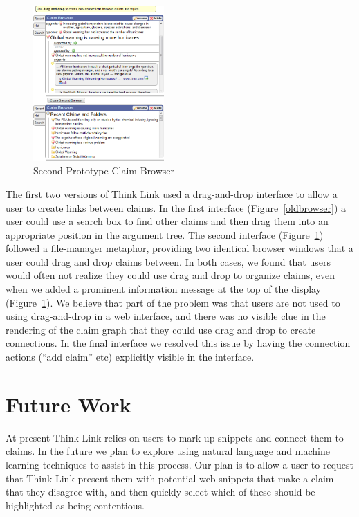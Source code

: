 \documentclass{chi2009}
\begin{document}
\begin{figure}[tb]
\begin{center}
	\includegraphics[width=5cm]{../screenshots/claimbrowse.png}
	\caption{Second Prototype Claim Browser}
	\label{secondbrowser}
\end{center}
\end{figure}

The first two versions of Think Link used a drag-and-drop interface to allow a user to create links between claims. In the first interface (Figure~\ref{oldbrowser}) a user could use a search box to find other claims and then drag them into an appropriate position in the argument tree. 
The second interface (Figure~\ref{secondbrowser}) followed a file-manager metaphor, providing two identical browser windows that a user could drag and drop claims between.  %
In both cases, we found that users would often not realize they could use drag and drop to organize claims, even when we added a prominent information message at the top of the display (Figure~\ref{secondbrowser}).  %
We believe that part of the problem was that users are not used to using drag-and-drop in a web interface, and there was no visible clue in the rendering of the claim graph that they could use drag and drop to create connections. In the final interface we resolved this issue by having the connection actions (``add claim'' etc) explicitly visible in the interface.

\section{Future Work}

At present Think Link relies on users to mark up snippets and connect them to claims. In the future we plan to explore using natural language and machine learning techniques to assist in this process. Our plan is to allow a user to request that Think Link present them with potential web snippets that make a claim that they disagree with, and then quickly select which of these should be highlighted as being contentious.
\end{document}
